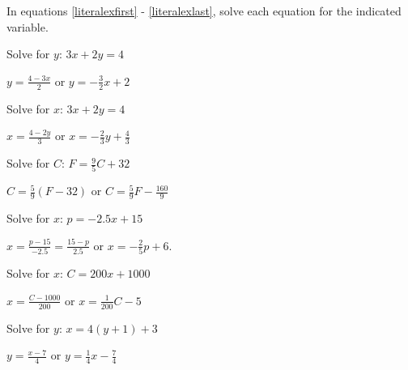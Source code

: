 \documentclass{ximera}
\begin{document}
\begin{question}

In equations \ref{literalexfirst} - \ref{literalexlast}, solve each equation for the indicated variable.

\begin{problem} \label{literalexfirst}
Solve for $y$:  $3x+2y = 4$

\begin{solution}
$y = \frac{4 - 3x}{2}$ or $y = -\frac{3}{2}x + 2$
\end{solution}
\end{problem}

\begin{problem}
Solve for $x$:  $3x+2y = 4$ 

\begin{solution}
$x = \frac{4 - 2y}{3}$ or $x = -\frac{2}{3} y + \frac{4}{3}$
\end{solution}
\end{problem}

\begin{problem}
Solve for $C$: $F = \frac{9}{5} C + 32$

\begin{solution}
$C = \frac{5}{9}(F - 32)$ or  $C = \frac{5}{9} F - \frac{160}{9}$
\end{solution}
\end{problem}

\begin{problem}
Solve for $x$:  $p = -2.5x + 15$

\begin{solution}
$x = \frac{p - 15}{-2.5} = \frac{15-p}{2.5}$ or $x = -\frac{2}{5} p + 6$.
\end{solution}
\end{problem}

\begin{problem}
Solve for $x$: $C = 200x + 1000$

\begin{solution}
$x = \frac{C - 1000}{200}$ or $x = \frac{1}{200} C - 5$
\end{solution}
\end{problem}

\begin{problem}
Solve for $y$:  $x= 4(y+1) + 3$ 

\begin{solution}
 $y = \frac{x-7}{4}$ or $y = \frac{1}{4} x - \frac{7}{4}$
\end{solution}
\end{problem}


\end{question}
\end{document}
